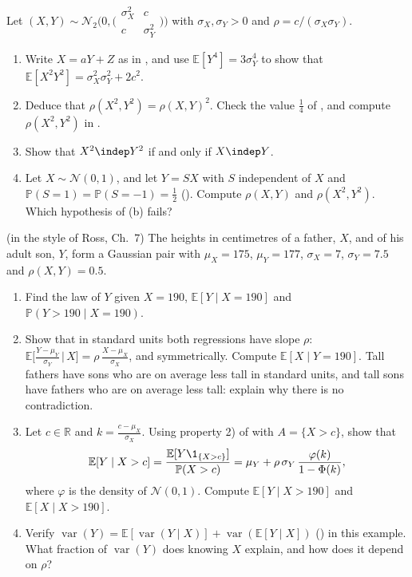 \begin{exercise}\label{ex:gc-squares}
\easy Let $(X,Y)\sim\mathcal N_2\big(0,\big(\begin{smallmatrix}\sigma_X^2&c\\c&\sigma_Y^2\end{smallmatrix}\big)\big)$
with $\sigma_X,\sigma_Y>0$ and $\rho=c/(\sigma_X\sigma_Y)$.
\begin{enumerate}[label=(\alph*)]
  \item Write $X=aY+Z$ as in , and use $\mathbb E[Y^4]=3\sigma_Y^4$ to show
    that $\mathbb E[X^2Y^2]=\sigma_X^2\sigma_Y^2+2c^2$.
  \item Deduce that $\rho(X^2,Y^2)=\rho(X,Y)^2$. Check the value $\frac14$ of
    , and compute $\rho(X^2,Y^2)$ in .
  \item Show that $X^2\indep Y^2$ if and only if $X\indep Y$.
  \item Let $X\sim\mathcal N(0,1)$, and let $Y=SX$ with $S$ independent of $X$ and
    $\mathbb P(S=1)=\mathbb P(S=-1)=\frac12$ (). Compute $\rho(X,Y)$ and
    $\rho(X^2,Y^2)$. Which hypothesis of (b) fails?
\end{enumerate}
\end{exercise}

\begin{exercise}\label{ex:gc-ross-heights}
\medium (in the style of Ross, Ch.~7) The heights in centimetres of a father, $X$, and of his adult
son, $Y$, form a Gaussian pair with $\mu_X=175$, $\mu_Y=177$, $\sigma_X=7$, $\sigma_Y=7.5$ and
$\rho(X,Y)=0.5$.
\begin{enumerate}[label=(\alph*)]
  \item Find the law of $Y$ given $X=190$, $\mathbb E[Y\mid X=190]$ and $\mathbb P(Y>190\mid X=190)$.
  \item Show that in standard units both regressions have slope $\rho$:
    $\mathbb E\big[\frac{Y-\mu_Y}{\sigma_Y}\,\big|\,X\big]=\rho\,\frac{X-\mu_X}{\sigma_X}$, and
    symmetrically. Compute $\mathbb E[X\mid Y=190]$. Tall fathers have sons who are on average less
    tall in standard units, and tall sons have fathers who are on average less tall: explain why
    there is no contradiction.
  \item Let $c\in\mathbb R$ and $k=\frac{c-\mu_X}{\sigma_X}$. Using property 2) of
     with $A=\{X>c\}$, show that
    \[
      \mathbb E[Y\mid X>c]=\frac{\mathbb E[Y\1_{\{X>c\}}]}{\mathbb P(X>c)}
      =\mu_Y+\rho\,\sigma_Y\,\frac{\varphi(k)}{1-\Phi(k)},
    \]
    where $\varphi$ is the density of $\mathcal N(0,1)$. Compute $\mathbb E[Y\mid X>190]$ and
    $\mathbb E[X\mid X>190]$.
  \item Verify $\operatorname{var}(Y)=\mathbb E[\operatorname{var}(Y\mid X)]+\operatorname{var}(\mathbb E[Y\mid X])$
    () in this example. What fraction of $\operatorname{var}(Y)$ does
    knowing $X$ explain, and how does it depend on $\rho$?
\end{enumerate}
\end{exercise}

